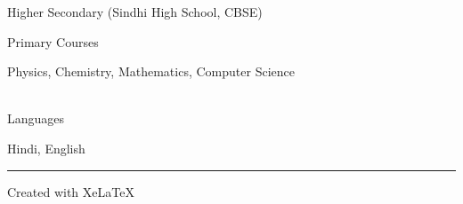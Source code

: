 \documentclass[a4paper,10pt]{article} %
\begin{document}
\bigskip

\par{\centering\Large \hypertarget{hs}{Higher Secondary (Sindhi High School, CBSE) }\par}
\begin{center}
\large{Primary Courses\par}
\normalsize
Physics, Chemistry, Mathematics, Computer Science \\
~\\
\large{Languages\par}
\normalsize
Hindi, English \\
\end{center}
\bigskip
\hrule
\bigskip
\vfill
\centerline{Created with Xe\LaTeX\ }
\end{document}
